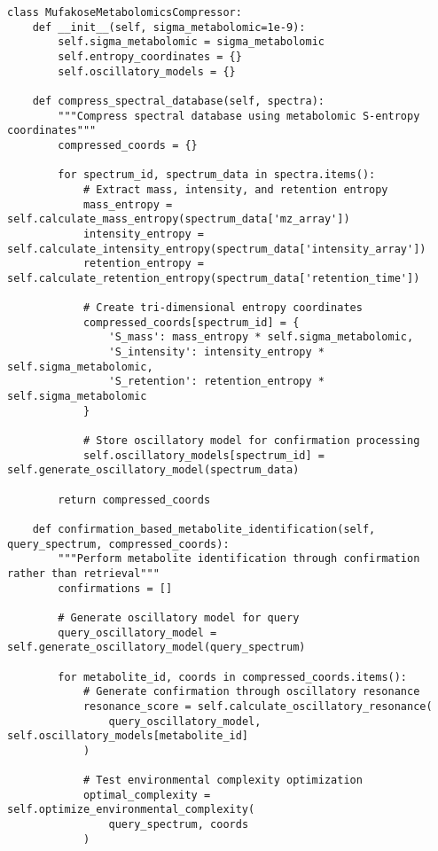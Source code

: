 \documentclass[12pt,a4paper]{article}
\begin{document}
\begin{lstlisting}[style=pythonstyle, caption=S-Entropy Compression Implementation for Metabolomics]
class MufakoseMetabolomicsCompressor:
    def __init__(self, sigma_metabolomic=1e-9):
        self.sigma_metabolomic = sigma_metabolomic
        self.entropy_coordinates = {}
        self.oscillatory_models = {}
    
    def compress_spectral_database(self, spectra):
        """Compress spectral database using metabolomic S-entropy coordinates"""
        compressed_coords = {}
        
        for spectrum_id, spectrum_data in spectra.items():
            # Extract mass, intensity, and retention entropy
            mass_entropy = self.calculate_mass_entropy(spectrum_data['mz_array'])
            intensity_entropy = self.calculate_intensity_entropy(spectrum_data['intensity_array'])
            retention_entropy = self.calculate_retention_entropy(spectrum_data['retention_time'])
            
            # Create tri-dimensional entropy coordinates
            compressed_coords[spectrum_id] = {
                'S_mass': mass_entropy * self.sigma_metabolomic,
                'S_intensity': intensity_entropy * self.sigma_metabolomic,
                'S_retention': retention_entropy * self.sigma_metabolomic
            }
            
            # Store oscillatory model for confirmation processing
            self.oscillatory_models[spectrum_id] = self.generate_oscillatory_model(spectrum_data)
        
        return compressed_coords
    
    def confirmation_based_metabolite_identification(self, query_spectrum, compressed_coords):
        """Perform metabolite identification through confirmation rather than retrieval"""
        confirmations = []
        
        # Generate oscillatory model for query
        query_oscillatory_model = self.generate_oscillatory_model(query_spectrum)
        
        for metabolite_id, coords in compressed_coords.items():
            # Generate confirmation through oscillatory resonance
            resonance_score = self.calculate_oscillatory_resonance(
                query_oscillatory_model, self.oscillatory_models[metabolite_id]
            )
            
            # Test environmental complexity optimization
            optimal_complexity = self.optimize_environmental_complexity(
                query_spectrum, coords
            )
            

\end{lstlisting}
\end{document}
